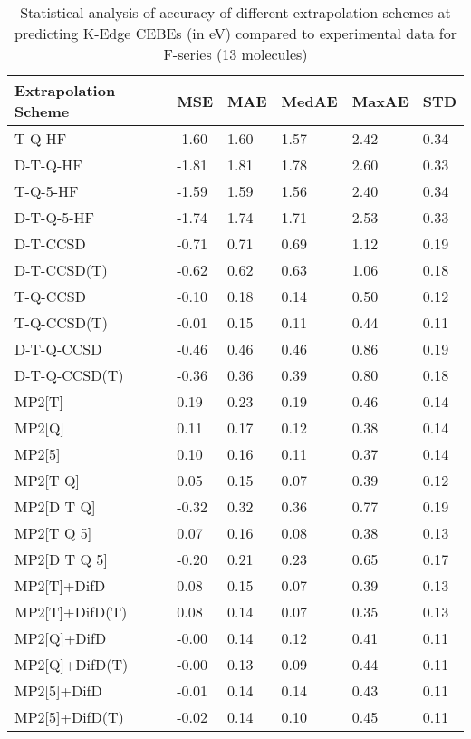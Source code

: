\begin{table}
  \caption{Statistical analysis of accuracy of different extrapolation schemes at predicting K-Edge CEBEs (in eV) compared to experimental data for F-series (13 molecules)}
  \label{tbl:summary-f}
  \begin{tabular}{l l l l l l }
    \toprule
    \textbf{Extrapolation Scheme} & \textbf{MSE} & \textbf{MAE} & \textbf{MedAE} & \textbf{MaxAE} & \textbf{STD} \\ 
    \midrule
    T-Q-HF & -1.60 & 1.60 & 1.57 & 2.42 & 0.34 \\ 
    D-T-Q-HF & -1.81 & 1.81 & 1.78 & 2.60 & 0.33 \\ 
    T-Q-5-HF & -1.59 & 1.59 & 1.56 & 2.40 & 0.34 \\ 
    D-T-Q-5-HF & -1.74 & 1.74 & 1.71 & 2.53 & 0.33 \\ 
    D-T-CCSD & -0.71 & 0.71 & 0.69 & 1.12 & 0.19 \\ 
    D-T-CCSD(T) & -0.62 & 0.62 & 0.63 & 1.06 & 0.18 \\ 
    T-Q-CCSD & -0.10 & 0.18 & 0.14 & 0.50 & 0.12 \\ 
    T-Q-CCSD(T) & -0.01 & 0.15 & 0.11 & 0.44 & 0.11 \\ 
    D-T-Q-CCSD & -0.46 & 0.46 & 0.46 & 0.86 & 0.19 \\ 
    D-T-Q-CCSD(T) & -0.36 & 0.36 & 0.39 & 0.80 & 0.18 \\ 
    MP2[T] & 0.19 & 0.23 & 0.19 & 0.46 & 0.14 \\ 
    MP2[Q] & 0.11 & 0.17 & 0.12 & 0.38 & 0.14 \\ 
    MP2[5] & 0.10 & 0.16 & 0.11 & 0.37 & 0.14 \\ 
    MP2[T Q] & 0.05 & 0.15 & 0.07 & 0.39 & 0.12 \\ 
    MP2[D T Q] & -0.32 & 0.32 & 0.36 & 0.77 & 0.19 \\ 
    MP2[T Q 5] & 0.07 & 0.16 & 0.08 & 0.38 & 0.13 \\ 
    MP2[D T Q 5] & -0.20 & 0.21 & 0.23 & 0.65 & 0.17 \\ 
    MP2[T]+DifD & 0.08 & 0.15 & 0.07 & 0.39 & 0.13 \\ 
    MP2[T]+DifD(T) & 0.08 & 0.14 & 0.07 & 0.35 & 0.13 \\ 
    MP2[Q]+DifD & -0.00 & 0.14 & 0.12 & 0.41 & 0.11 \\ 
    MP2[Q]+DifD(T) & -0.00 & 0.13 & 0.09 & 0.44 & 0.11 \\ 
    MP2[5]+DifD & -0.01 & 0.14 & 0.14 & 0.43 & 0.11 \\ 
    MP2[5]+DifD(T) & -0.02 & 0.14 & 0.10 & 0.45 & 0.11 \\ 

\end{tabular}
\end{table}
